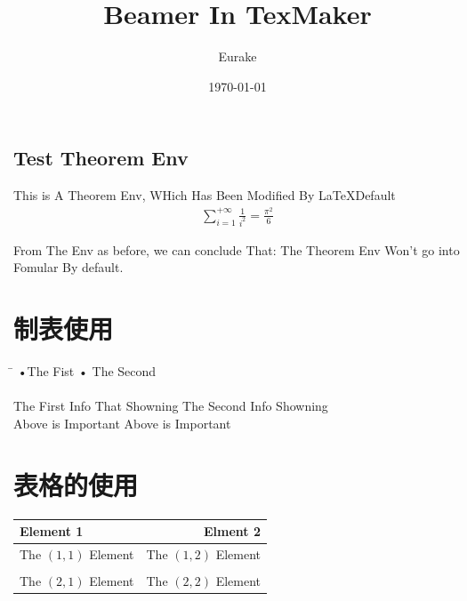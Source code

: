 \documentclass[11pt]{beamer}
\author{Eurake}
\title{Beamer In TexMaker}
\institute{@ZHIHU}
\date{\today}
\begin{document}
	\begin{frame}
		\titlepage
		\thispagestyle{plain}
	\end{frame}
	
	\begin{frame}
		\tableofcontents
	\end{frame}
	

	\begin{frame}
		\section{Test Theorem Env}		
		\begin{theorem}
			This is A Theorem Env, WHich Has Been Modified By \LaTeX Default
			\begin{align}
				\sum_{i=1}^{+\infty}{\frac{1}{i^2}}= \frac{\pi^2}{6}
			\end{align}
		\end{theorem}
		
		From The Env as before, we can conclude That: 
		The Theorem Env Won't go into Fomular By default.
	\end{frame}

	\section{制表使用}
	\begin{frame}
		\begin{tabbing}
		\hspace{16em}\=\kill
		 •The Fist \> • The Second\\
		 \bigskip\\
		 The First Info That Showning \> The Second Info  Showning\\
		 Above is Important \> Above is Important\\
		\end{tabbing} 
	\end{frame}

	\section{表格的使用}
	\begin{frame}
		\begin{tabular}{lr}
		\hline
		Element 1 & Elment 2\\ 
		\hline
		The $(1, 1)$ Element & The $(1, 2)$ Element \\ 
		\vspace{1em}\\
		The $(2, 1)$ Element & The $(2, 2)$ Element \\ 
		\hline 
		\end{tabular} 
	\end{frame}
\end{document}
